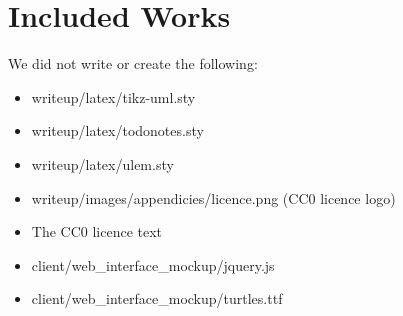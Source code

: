 \section{Included Works}
We did not write or create the following:
\begin{itemize}
\item writeup/latex/tikz-uml.sty
\item writeup/latex/todonotes.sty
\item writeup/latex/ulem.sty
\item writeup/images/appendicies/licence.png (CC0 licence logo)
\item The CC0 licence text
\item client/web\_interface\_mockup/jquery.js
\item client/web\_interface\_mockup/turtles.ttf
\end{itemize}
